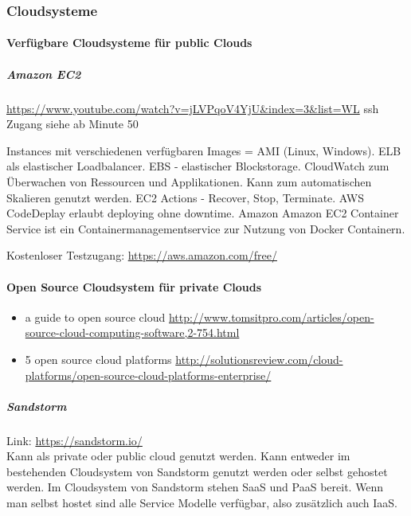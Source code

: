 \documentclass[a4paper,10pt]{article}
\begin{document}
\subsubsection{Cloudsysteme}


\paragraph{Verfügbare Cloudsysteme für public Clouds}

\subparagraph{Amazon EC2}

\url{https://www.youtube.com/watch?v=jLVPqoV4YjU&index=3&list=WL}
ssh Zugang siehe ab Minute 50

Instances mit verschiedenen verfügbaren Images = AMI (Linux, Windows).
ELB als elastischer Loadbalancer.
EBS - elastischer Blockstorage.
CloudWatch zum Überwachen von Ressourcen und Applikationen.
Kann zum automatischen Skalieren genutzt werden.
EC2 Actions - Recover, Stop, Terminate.
AWS CodeDeplay erlaubt deploying ohne downtime.
Amazon
Amazon EC2 Container Service ist ein Containermanagementservice zur Nutzung von Docker Containern.

Kostenloser Testzugang: \url{https://aws.amazon.com/free/}

\paragraph{Open Source Cloudsystem für private Clouds}

\begin{itemize}
 \item a guide to open source cloud \url{http://www.tomsitpro.com/articles/open-source-cloud-computing-software,2-754.html}
 \item 5 open source cloud platforms \url{http://solutionsreview.com/cloud-platforms/open-source-cloud-platforms-enterprise/}
\end{itemize}

\subparagraph{Sandstorm}

Link: \url{https://sandstorm.io/}\\

Kann als private oder public cloud genutzt werden.
Kann entweder im bestehenden Cloudsystem von Sandstorm genutzt werden oder selbst gehostet werden.
Im Cloudsystem von Sandstorm stehen SaaS und PaaS bereit.
Wenn man selbst hostet sind alle Service Modelle verfügbar, also zusätzlich auch IaaS.
\end{document}
